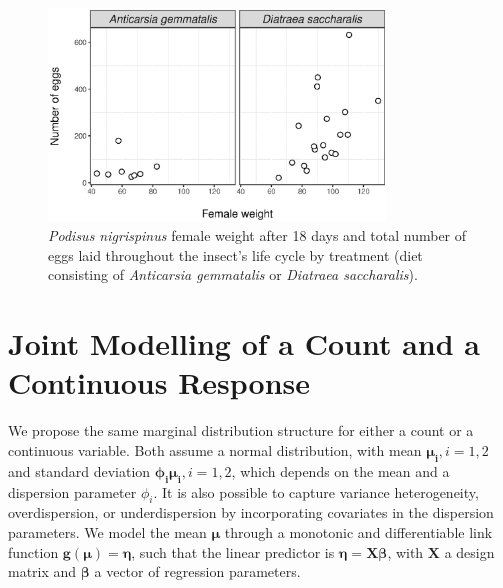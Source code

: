 \documentclass[useAMS,referee]{biom}
\begin{document}
\begin{figure}[htb]
	\centering
	\includegraphics[width=0.8\textwidth]{pod1}
	\caption{\textit{Podisus nigrispinus} female weight after 18 days and total number of eggs laid throughout the insect's life cycle by treatment (diet consisting of \textit{Anticarsia gemmatalis} or \textit{Diatraea saccharalis}).}
	\label{fig1.1}
\end{figure}


\section{Joint Modelling of a Count and a Continuous Response}
\label{s:model}


We propose the same marginal distribution structure for either a count or a continuous variable. Both assume a normal distribution, with mean $\boldsymbol{\mu_i}, i=1,2$ and standard deviation $\boldsymbol{\phi_i}\boldsymbol{\mu_i}, i=1,2$, which depends on the mean and a dispersion parameter $\phi_i$. It is also possible to capture variance heterogeneity, overdispersion, or underdispersion by incorporating covariates in the dispersion parameters. We model the mean $\boldsymbol{\mu}$ through a monotonic and differentiable link function $\boldsymbol{\mathbf{g}(\mu) = \eta}$, such that the linear predictor is $\boldsymbol{\eta} = \mathbf{X}\boldsymbol{\beta}$, with $\mathbf{X}$ a design matrix and $\boldsymbol{\beta}$ a vector of regression parameters.
\end{document}
